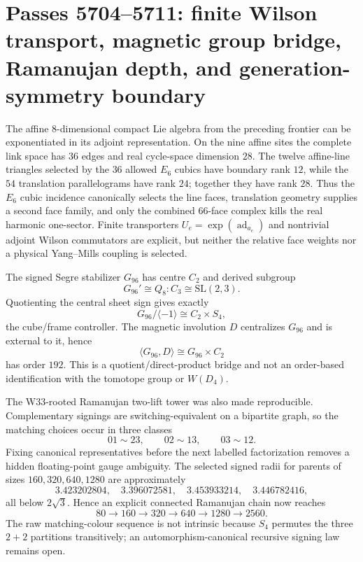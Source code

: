 \section*{Passes 5704--5711: finite Wilson transport, magnetic group bridge, Ramanujan depth, and generation-symmetry boundary}
\label{sec:pass5704-5711}

The affine $8$-dimensional compact Lie algebra from the preceding frontier can be exponentiated in its adjoint representation.  On the nine affine sites the complete link space has $36$ edges and real cycle-space dimension $28$.  The twelve affine-line triangles selected by the $36$ allowed $E_6$ cubics have boundary rank $12$, while the $54$ translation parallelograms have rank $24$; together they have rank $28$.  Thus the $E_6$ cubic incidence canonically selects the line faces, translation geometry supplies a second face family, and only the combined $66$-face complex kills the real harmonic one-sector.  Finite transporters $U_e=\exp(\operatorname{ad}_{a_e})$ and nontrivial adjoint Wilson commutators are explicit, but neither the relative face weights nor a physical Yang--Mills coupling is selected.

The signed Segre stabilizer $G_{96}$ has centre $C_2$ and derived subgroup
\[
G_{96}'\cong Q_8\!:\!C_3\cong \mathrm{SL}(2,3).
\]
Quotienting the central sheet sign gives exactly
\[
G_{96}/\langle-1\rangle\cong C_2\times S_4,
\]
the cube/frame controller.  The magnetic involution $D$ centralizes $G_{96}$ and is external to it, hence
\[
\langle G_{96},D\rangle\cong G_{96}\times C_2
\]
has order $192$.  This is a quotient/direct-product bridge and not an order-based identification with the tomotope group or $W(D_4)$.

The W33-rooted Ramanujan two-lift tower was also made reproducible.  Complementary signings are switching-equivalent on a bipartite graph, so the matching choices occur in three classes
\[
01\sim23,\qquad 02\sim13,\qquad 03\sim12.
\]
Fixing canonical representatives before the next labelled factorization removes a hidden floating-point gauge ambiguity.  The selected signed radii for parents of sizes $160,320,640,1280$ are approximately
\[
3.423202804,\quad 3.396072581,\quad 3.453933214,\quad 3.446782416,
\]
all below $2\sqrt3$.  Hence an explicit connected Ramanujan chain now reaches
\[
80\to160\to320\to640\to1280\to2560.
\]
The raw matching-colour sequence is not intrinsic because $S_4$ permutes the three $2+2$ partitions transitively; an automorphism-canonical recursive signing law remains open.

